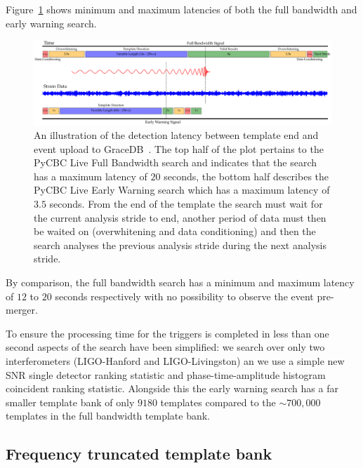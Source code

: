 Figure~\ref{6:fig:latency_plot} shows minimum and maximum latencies of both the full bandwidth and early warning search.
%
\begin{landscape}
\begin{figure}
    \centering
    \includegraphics[width=\columnwidth]{images/6_earlywarning/gw170817/latency_plot_new_font.pdf}
    \caption{An illustration of the detection latency between template end and event upload to GraceDB~\cite{ligo_gracedb:2024}. The top half of the plot pertains to the PyCBC Live Full Bandwidth search and indicates that the search has a maximum latency of $20$ seconds, the bottom half describes the PyCBC Live Early Warning search which has a maximum latency of $3.5$ seconds. From the end of the \gwadj template the search must wait for the current analysis stride to end, another period of data must then be waited on (overwhitening and data conditioning) and then the search analyses the previous analysis stride during the next analysis stride.}
    \label{6:fig:latency_plot}
\end{figure}
\end{landscape}
%
By comparison, the full bandwidth search has a minimum and maximum latency of $12$ to $20$ seconds respectively with no possibility to observe the event pre-merger.

To ensure the processing time for the triggers is completed in less than one second aspects of the search have been simplified: we search over only two interferometers (LIGO-Hanford and LIGO-Livingston) an we use a simple new SNR single detector ranking statistic and phase-time-amplitude histogram coincident ranking statistic. Alongside this the early warning search has a far smaller template bank of only $9180$ templates compared to the ${\sim}700,000$ templates in the full bandwidth template bank.

\subsection{\label{6:sec:early-warning-template-bank}Frequency truncated template bank}

